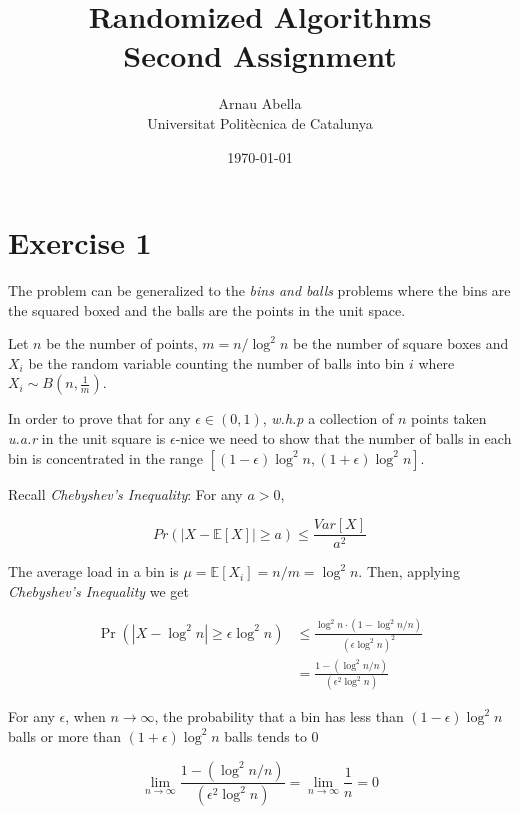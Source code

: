 \documentclass[12pt, a4paper]{article} %
\title{%
  Randomized Algorithms\\
  \large{Second Assignment}
}
\author{%
  Arnau Abella \\
  \large{Universitat Polit\`ecnica de Catalunya}
}
\date{\today}
\newcommand\expect[1]{\mathbb{E}[#1]}
\begin{document}
\maketitle


\section*{Exercise 1}%
\label{sec:exercise_1}

The problem can be generalized to the \textit{bins and balls} problems where the bins are the squared boxed and the balls are the points in the unit space.

Let $n$ be the number of points, $m = n/\log^{2}n$ be the number of square boxes and $X_{i}$ be the random variable counting the number of balls into bin $i$ where $X_{i} \sim B(n, \frac{1}{m})$.

In order to prove that for any $\epsilon \in (0,1)$, \textit{w.h.p} a collection of $n$ points taken \textit{u.a.r} in the unit square is $\epsilon$-nice we need to show that the number of balls in each bin is concentrated in the range $[(1-\epsilon) \log^{2}n, (1 + \epsilon)\log^{2}n]$.

Recall \textit{Chebyshev's Inequality}: For any $a > 0$,

\begin{equation*}
  Pr(|X - \expect{X} | \geq a) \leq \frac{Var[X]}{a^2}
\end{equation*}

The average load in a bin is $\mu = \expect{X_{i}} = n/m = \log^{2} n$. Then, applying \textit{Chebyshev's Inequality} we get

\begin{align*}
  \Pr(|X - \log^{2}n | \geq \epsilon \log^{2}n) &\leq \frac{\log^{2}n \cdot (1 - \log^{2}n/n)}{(\epsilon\log^{2}n)^2} \\
  &= \frac{1 - (\log^{2}n/n)}{(\epsilon^2\log^{2}n)}
\end{align*}

For any $\epsilon$, when $n \to \infty$, the probability that a bin has less than ${(1-\epsilon) \log^{2}n}$ balls or more than $(1 + \epsilon)\log^{2}n$ balls tends to $0$

\begin{equation*}
  \lim_{n \to \infty} \frac{1 - (\log^{2}n/n)}{(\epsilon^2\log^{2}n)} =
  \lim_{n \to \infty} \frac{1}{n} = 0
\end{equation*}
\end{document}
